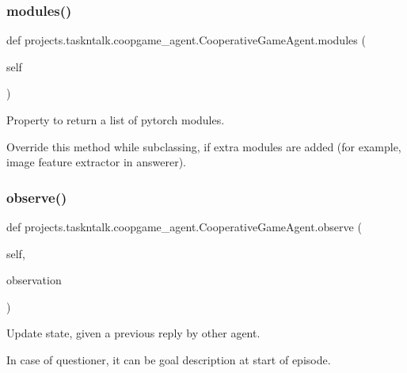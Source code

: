 \subsubsection{\texorpdfstring{modules()}{modules()}}
{\footnotesize\ttfamily def projects.\+taskntalk.\+coopgame\+\_\+agent.\+Cooperative\+Game\+Agent.\+modules (\begin{DoxyParamCaption}\item[{}]{self }\end{DoxyParamCaption})}

\begin{DoxyVerb}Property to return a list of pytorch modules.

Override this method while subclassing, if extra modules are added (for example,
image feature extractor in answerer).
\end{DoxyVerb}
 \mbox{\label{classprojects_1_1taskntalk_1_1coopgame__agent_1_1CooperativeGameAgent_a6c3dbce5e745edf451daff9474b6a52f}} 
\subsubsection{\texorpdfstring{observe()}{observe()}}
{\footnotesize\ttfamily def projects.\+taskntalk.\+coopgame\+\_\+agent.\+Cooperative\+Game\+Agent.\+observe (\begin{DoxyParamCaption}\item[{}]{self,  }\item[{}]{observation }\end{DoxyParamCaption})}

\begin{DoxyVerb}Update state, given a previous reply by other agent.

In case of questioner, it can be goal description at start of episode.
\end{DoxyVerb}
 \mbox{\label{classprojects_1_1taskntalk_1_1coopgame__agent_1_1CooperativeGameAgent_aa5fe586f3c20c7db8eea6ffae87b0a34}} 
